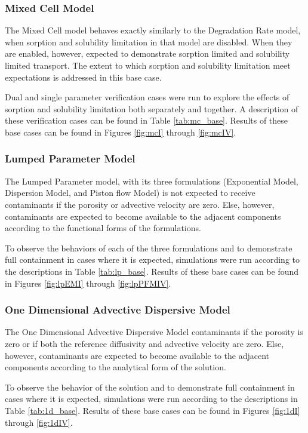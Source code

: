 \subsubsection{Mixed Cell Model}
The Mixed Cell model behaves exactly similarly to the Degradation Rate 
model, when sorption and solubility limitation in that model are disabled. When they are 
enabled, however, expected to demonstrate sorption limited and solubility 
limited transport. The extent to which sorption and solubility limitation meet 
expectations is addressed in this base case.

Dual and single parameter verification cases were run to explore the effects of sorption and 
solubility limitation both separately and together. A description of these verification 
cases can be found in Table \ref{tab:mc_base}. 
Results of these base cases can be found in Figures \ref{fig:mcI} through 
\ref{fig:mcIV}.



\clearpage

\subsubsection{Lumped Parameter Model}
The Lumped Parameter model, with its three formulations (Exponential Model, 
Dispersion Model, and Piston flow Model) is not expected to receive 
contaminants if the porosity or advective velocity are zero. Else, however, 
contaminants are expected to  become available to the adjacent components 
according to the functional forms of the formulations. 

To observe the behaviors of each of the three formulations and to demonstrate 
full containment in cases where it is expected, simulations were run
according to the descriptions in Table \ref{tab:lp_base}.
Results of these base cases can be found in Figures 
\ref{fig:lpEMI} through \ref{fig:lpPFMIV}.



\clearpage

\subsubsection{One Dimensional Advective Dispersive Model}
The One Dimensional Advective Dispersive Model contaminants if the porosity is 
zero or if both the reference diffusivity and advective velocity are zero. 
Else, however, contaminants are expected to  become available to the adjacent 
components according to the analytical form of the solution.

To observe the behavior of the solution and to demonstrate full containment in 
cases where it is expected, simulations were run according to the descriptions 
in Table \ref{tab:1d_base}.  Results of these base cases can be found in 
Figures \ref{fig:1dI} through \ref{fig:1dIV}.  

%
%
\clearpage
